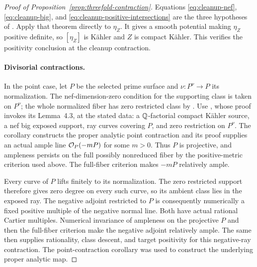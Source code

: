 \begin{proof}[Proof of Proposition~\ref{prop:threefold-contraction}]
Equations \eqref{eq:cleanup-nef}, \eqref{eq:cleanup-big}, and
\eqref{eq:cleanup-positive-intersections} are the three hypotheses of
\cite[Theorem~2.29]{DasHaconPaun2024}.  Apply that theorem directly to
\(\eta_Z\).  It gives a smooth potential making \(\eta_Z\) positive
definite, so \([\eta_Z]\) is K\"ahler and \(Z\) is compact K\"ahler.
This verifies the positivity conclusion at the cleanup contraction.

\paragraph{Divisorial contractions.}
In the point case, let \(P\) be the selected prime surface and
\(\nu:P^\nu\to P\) its normalization.  The nef-dimension-zero
condition for the supporting class is taken on \(P^\nu\); the whole
normalized fiber has zero restricted class by
\cite[Theorem~3.19(a) and its proof, p.~234]{HoeringPeternell2015}.
Use \cite[Corollary~4.4]{DasHacon2024OnMMP}, whose proof invokes its
Lemma~4.3, at the stated data: a \(\mathbb Q\)-factorial compact K\"ahler
source, a nef big exposed support, ray curves covering \(P\), and zero
restriction on \(P^\nu\).  The corollary constructs the proper analytic
point contraction and its proof supplies an actual ample line
\(\mathcal O_P(-mP)\) for some \(m>0\).  Thus \(P\) is projective, and
ampleness persists on the full possibly nonreduced fiber by the
positive-metric criterion used above.  The full-fiber criterion makes
\(-mP\) relatively ample.

Every curve of \(P\) lifts finitely to its normalization.  The zero
restricted support therefore gives zero degree on every such curve, so
its ambient class lies in the exposed ray.  The negative adjoint
restricted to \(P\) is consequently numerically a fixed positive
multiple of the negative normal line.  Both have actual rational Cartier
multiples.  Numerical invariance of ampleness on the projective \(P\)
and then the full-fiber criterion make the negative adjoint relatively
ample.  The same
\cite[Proposition~3.1 and proof of Corollary~3.1]{CampanaHoeringPeternell2016}
then supplies rationality, class descent, and target positivity for this
negative-ray contraction.  The point-contraction corollary was used
to construct the underlying proper analytic map.


\end{proof}
